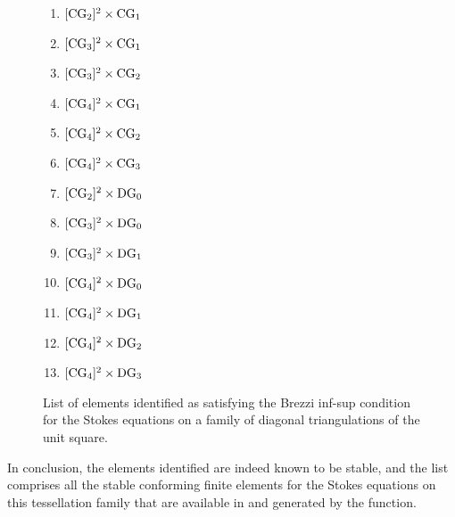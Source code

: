 \begin{figure}
  \begin{center}
    \begin{minipage}[t]{0.3\linewidth}
      \begin{enumerate}
      \item $[\mathrm{CG}_{2}]^{2} \times \mathrm{CG}_{1}$
      \item $[\mathrm{CG}_{3}]^{2} \times \mathrm{CG}_{1}$
      \item $[\mathrm{CG}_{3}]^{2} \times \mathrm{CG}_{2}$
      \item $[\mathrm{CG}_{4}]^{2} \times \mathrm{CG}_{1}$
      \item $[\mathrm{CG}_{4}]^{2} \times \mathrm{CG}_{2}$
      \end{enumerate}
    \end{minipage}
    \begin{minipage}[t]{0.3\linewidth}
      \begin{enumerate}
        \setcounter{enumi}{5}
      \item $[\mathrm{CG}_{4}]^{2} \times \mathrm{CG}_{3}$
      \item $[\mathrm{CG}_{2}]^{2} \times \mathrm{DG}_{0}$
      \item $[\mathrm{CG}_{3}]^{2} \times \mathrm{DG}_{0}$
      \item $[\mathrm{CG}_{3}]^{2} \times \mathrm{DG}_{1}$
      \end{enumerate}
      \end{minipage}
    \begin{minipage}[t]{0.3\linewidth}
      \begin{enumerate}
        \setcounter{enumi}{9}
      \item $[\mathrm{CG}_{4}]^{2} \times \mathrm{DG}_{0}$
      \item $[\mathrm{CG}_{4}]^{2} \times \mathrm{DG}_{1}$
      \item $[\mathrm{CG}_{4}]^{2} \times \mathrm{DG}_{2}$
      \item $[\mathrm{CG}_{4}]^{2} \times \mathrm{DG}_{3}$
      \end{enumerate}
    \end{minipage}
  \end{center}
  \caption{List of elements identified as satisfying the Brezzi
    inf-sup condition for the Stokes equations on a family of diagonal
    triangulations of the unit square.}
  \label{rognes:fig:stokeslist}
\end{figure}

In conclusion, the elements identified are indeed known to be stable,
and the list comprises all the stable conforming finite elements for
the Stokes equations on this tessellation family that are available in
\ffc{} and generated by the  function.

